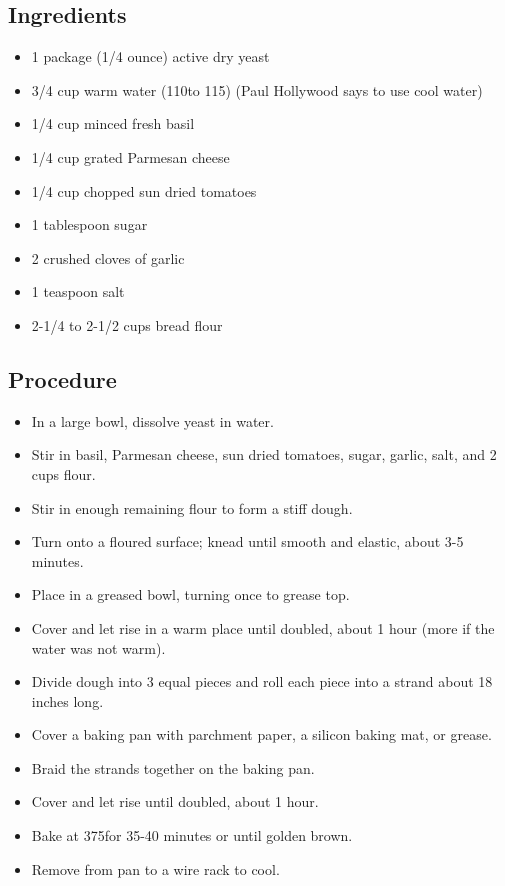 \documentclass[10pt, openany]{book}
\begin{document}
\subsection{Ingredients}
\begin{itemize}
  \item 1 package (1/4 ounce) active dry yeast
  \item 3/4 cup warm water (110\degree to 115\degree) (Paul Hollywood says to use cool water)
  \item 1/4 cup minced fresh basil
  \item 1/4 cup grated Parmesan cheese
  \item 1/4 cup chopped sun dried tomatoes
  \item 1 tablespoon sugar
  \item 2 crushed cloves of garlic
  \item 1 teaspoon salt
  \item 2-1/4 to 2-1/2 cups bread flour
\end{itemize}
\subsection{Procedure}
\begin{itemize}
  \item In a large bowl, dissolve yeast in water.
  \item Stir in basil, Parmesan cheese, sun dried tomatoes, sugar, garlic, salt, and 2 cups flour.
  \item Stir in enough remaining flour to form a stiff dough.
  \item Turn onto a floured surface; knead until smooth and elastic, about 3-5 minutes.
  \item Place in a greased bowl, turning once to grease top.
  \item Cover and let rise in a warm place until doubled, about 1 hour (more if the water was not warm).
  \item Divide dough into 3 equal pieces and roll each piece into a strand about 18 inches long.
  \item Cover a baking pan with parchment paper, a silicon baking mat, or grease.
  \item Braid the strands together on the baking pan.
  \item Cover and let rise until doubled, about 1 hour.
  \item Bake at 375\degree for 35-40 minutes or until golden brown.
  \item Remove from pan to a wire rack to cool.
\end{itemize}
\end{document}

